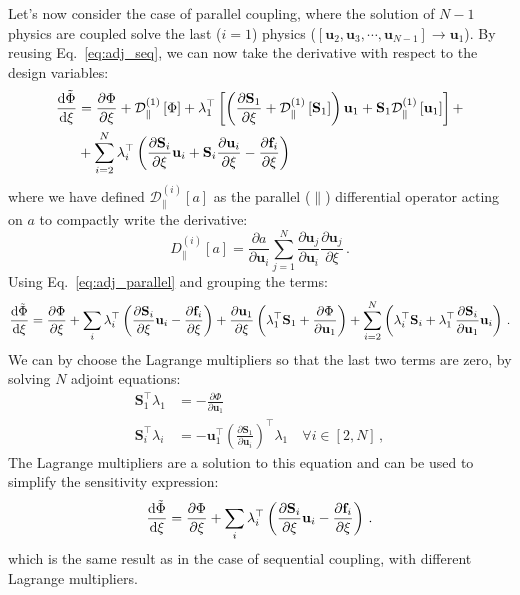Let's now consider the case of parallel coupling, where the solution of $N-1$ physics are coupled solve the last ($i=1$) physics ($[\mathbf{u}_2, \mathbf{u}_3, \cdots, \mathbf{u}_{N-1}] \to \mathbf{u}_1$). By reusing Eq.~\eqref{eq:adj_seq},
we can now take the derivative with respect to the design variables:
\begin{align}\label{eq:adj_parallel}
    \frac{\mathop{}\!\text{d} \tilde{\Phi}}{\mathop{}\!\text{d} \xi} &= \frac{\partial \Phi}{\partial \xi} + \mathcal{D}^{(1)}_\parallel \left[\Phi\right]  
    +  \lambda_{1}^{\top} \left[\left( \frac{\partial \mathbf{S}_1}{\partial \xi} +  \mathcal{D}^{(1)}_\parallel \left[\mathbf{S}_1\right] \right) \mathbf{u}_1
    + \mathbf{S}_1  \mathcal{D}^{(1)}_\parallel \left[\mathbf{u}_1\right] \right] + \\
    &+ \sum_{i=2}^{N} \lambda_{i}^{\top} \left( \frac{\partial \mathbf{S}_i}{\partial \xi}\mathbf{u}_i + \mathbf{S}_i \frac{\partial \mathbf{u}_i}{\partial \xi} - \frac{\partial \mathbf{f}_i}{\partial \xi}\right)
\end{align}
where we have defined $\mathcal{D}^{(i)}_\parallel[a]$ as the parallel ($\parallel$) differential operator acting on $a$ to compactly write the derivative:
\begin{equation}
    D^{(i)}_\parallel[a] = \frac{\partial a}{\partial \mathbf{u}_i} \sum_{j=1}^{N} \frac{\partial \mathbf{u}_j}{\partial \mathbf{u}_i} 
    \frac{\partial \mathbf{u}_j}{\partial \xi}\,.
\end{equation}
Using Eq.~\eqref{eq:adj_parallel} and grouping the terms:
\begin{equation}
    \frac{\mathop{}\!\text{d} \tilde{\Phi}}{\mathop{}\!\text{d} \xi} = \frac{\partial \Phi}{\partial \xi} + \sum_i \lambda_{i}^{\top} \left( \frac{\partial \mathbf{S}_i}{\partial \xi} \mathbf{u}_i - \frac{\partial \mathbf{f}_i}{\partial \xi} \right)
    + \frac{\partial \mathbf{u}_1}{\partial \xi} \left( \lambda_{1}^{\top}  \mathbf{S}_1 + \frac{\partial \Phi}{\partial \mathbf{u}_1} \right) + 
    \sum^{N}_{i=2} \left( \lambda_{i}^{\top} \mathbf{S}_i + \lambda_{1}^{\top}  \frac{\partial \mathbf{S}_i}{\partial \mathbf{u}_1} \mathbf{u}_i\right)\,.
\end{equation}
We can by choose the Lagrange multipliers so that the last two terms are zero, by solving $N$ adjoint equations:
\begin{align}
    \mathbf{S}^\top_{1}\lambda_{1} &= - \frac{\partial \Phi}{\partial \mathbf{u}_{1}} \label{eq:par_adj_1}\,\\
    \mathbf{S}^\top_{i}\lambda_{i} &= - \mathbf{u}^\top_1 \left(\frac{\partial \mathbf{S}_1}{\partial \mathbf{u}_i}\right)^\top \lambda_1 \quad \forall i \in [2, N] \label{eq:par_adj_N-1}\,,
\end{align}
The Lagrange multipliers are a solution to this equation and can be used to simplify the sensitivity expression:
\begin{equation}
    \frac{\mathop{}\!\text{d} \tilde{\Phi}}{\mathop{}\!\text{d} \xi} = \frac{\partial \Phi}{\partial \xi} + \sum_i \lambda_{i}^{\top} \left( \frac{\partial \mathbf{S}_i}{\partial \xi} \mathbf{u}_i - \frac{\partial \mathbf{f}_i}{\partial \xi} \right)\,.
\end{equation}
which is the same result as in the case of sequential coupling, with different Lagrange multipliers.

